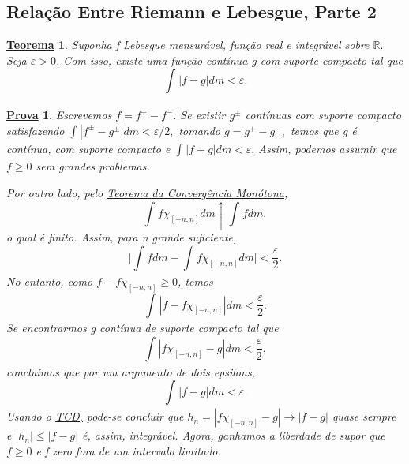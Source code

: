 \documentclass{article}
\newtheorem*{theorem*}{\underline{Teorema}}
\newtheorem*{proof*}{\underline{Prova}}
\begin{document}
\subsection{Relação Entre Riemann e Lebesgue, Parte 2}
\begin{theorem*}
  Suponha f Lebesgue mensurável, função real e integrável sobre \(\mathbb{R}.\) Seja \(\varepsilon >0\). 
Com isso, existe uma função contínua g com suporte compacto tal que 
  \[
    \int_{}|f-g| dm < \varepsilon .
  \]
\end{theorem*}
\begin{proof*}
  Escrevemos \(f = f^{+} - f^{-}.\) Se existir \(g^{\pm} \) contínuas com suporte compacto satisfazendo \(\int_{}|f^{\pm} - g^{\pm}| dm < \varepsilon /2,\) 
tomando \(g = g^{+} - g^{-},\) temos que g é contínua, com suporte compacto e \(\int_{}|f-g| dm < \varepsilon .\) Assim, podemos assumir que \(f\geq 0\) sem grandes problemas. 

Por outro lado, pelo \hyperlink{monotone_convergence}{\textit{Teorema da Convergência Monótona}},
  \[
    \int_{}f \chi_{[-n, n]} dm \uparrow \int_{}f dm,
  \]
o qual é finito. Assim, para n grande suficiente,
  \[
    \biggl\vert \int_{}f dm - \int_{}f \chi_{[-n, n]} dm \biggr\vert < \frac{\varepsilon }{2}.
  \]
No entanto, como \(f - f \chi_{[-n, n]} \geq 0\), temos
  \[
    \int_{}|f - f \chi_{[-n, n]}| dm < \frac{\varepsilon }{2}.
  \]
  Se encontrarmos g contínua de suporte compacto tal que
    \[
      \int_{}|f \chi_{[-n, n]} - g| dm < \frac{\varepsilon }{2},
    \]
  concluímos que por um argumento de dois epsilons,
    \[
      \int_{}|f-g| dm < \varepsilon.
    \]
  Usando o \hyperlink{monotone_convergence}{\textit{TCD,}} pode-se concluir que \(h_{n} = |f \chi_{[-n, n]} - g|\to |f-g|\) quase sempre e \(|h_{n}| \leq |f-g|\) é, assim, integrável. Agora, ganhamos a liberdade de supor que \(f \geq 0\) e 
  f zero fora de um intervalo limitado.  


\end{proof*}
\end{document}
